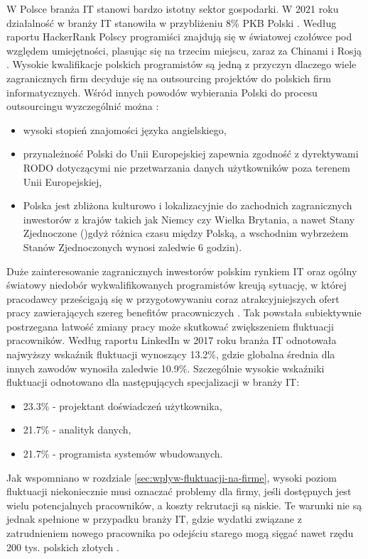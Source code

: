 W Polsce branża IT stanowi bardzo istotny sektor gospodarki.
W 2021 roku działalność w branży IT stanowiła w przybliżeniu 8\% PKB Polski \cite{piih-2021}.
Według raportu HackerRank Polscy programiści znajdują się w światowej czołówce pod względem umiejętności, plasując się na trzecim miejscu, zaraz za Chinami i Rosją \cite{hackerrank-2021}.
Wysokie kwalifikacje polskich programistów są jedną z przyczyn dlaczego wiele zagranicznych firm decyduje się na outsourcing projektów do polskich firm informatycznych.
Wśród innych powodów wybierania Polski do procesu outsourcingu wyzczególnić można \cite{softwaremind-2021}:
\begin{itemize}
    \item wysoki stopień znajomości języka angielskiego,
    \item przynależność Polski do Unii Europejskiej zapewnia zgodność z dyrektywami RODO dotyczącymi nie przetwarzania danych użytkowników poza terenem Unii Europejskiej,
    \item Polska jest zbliżona kulturowo i lokalizacyjnie do zachodnich zagranicznych inwestorów z krajów takich jak Niemcy czy Wielka Brytania, a nawet Stany Zjednoczone ()gdyż różnica czasu między Polską, a wschodnim wybrzeżem Stanów Zjednoczonych wynosi zaledwie 6 godzin).
\end{itemize}

Duże zainteresowanie zagranicznych inwestorów polskim rynkiem IT oraz ogólny światowy niedobór wykwalifikowanych programistów \cite{daxx-2021}
kreują sytuację, w której pracodawcy prześcigają się w przygotowywaniu coraz atrakcyjniejszych ofert pracy zawierających szereg benefitów pracowniczych \cite{it-benefits-2020}.
Tak powstała subiektywnie postrzegana łatwość zmiany pracy może skutkować zwiększeniem fluktuacji pracowników.
Według raportu LinkedIn \cite{linkedin-2018} w 2017 roku branża IT odnotowała najwyższy wskaźnik fluktuacji wynoszący 13.2\%, gdzie globalna średnia dla innych zawodów wynosiła zaledwie 10.9\%.
Szczególnie wysokie wskaźniki fluktuacji odnotowano dla następujących specjalizacji w branży IT:
\begin{itemize}
    \item 23.3\% - projektant doświadczeń użytkownika,
    \item 21.7\% - analityk danych,
    \item 21.7\% - programista systemów wbudowanych.
\end{itemize}

Jak wspomniano w rozdziale \ref{sec:wplyw-fluktuacji-na-firme}, wysoki poziom fluktuacji niekoniecznie musi oznaczać problemy dla firmy, jeśli dostępnych jest wielu potencjalnych pracowników, a koszty rekrutacji są niskie.
Te warunki nie są jednak spełnione w przypadku branży IT, gdzie wydatki związane z zatrudnieniem nowego pracownika po odejściu starego mogą sięgać nawet rzędu 200 tys. polskich złotych \cite{hairing-dev-2021}.

